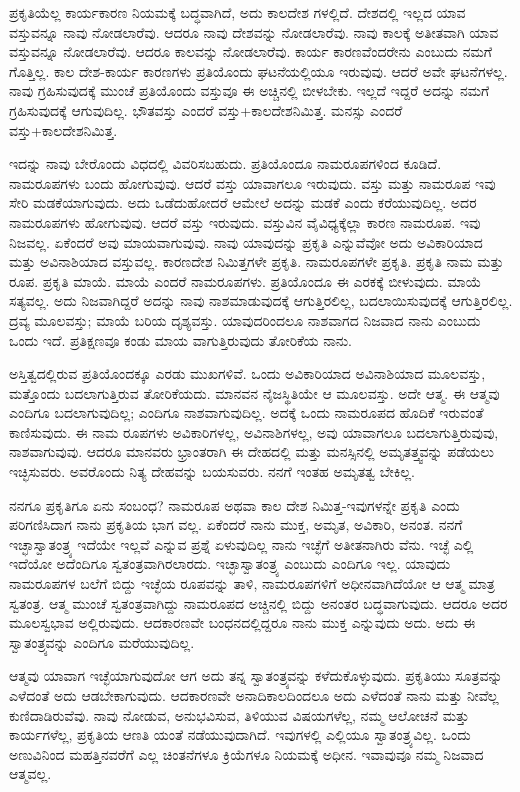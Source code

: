 ಪ್ರಕೃತಿಯೆಲ್ಲ ಕಾರ್ಯಕಾರಣ ನಿಯಮಕ್ಕೆ ಬದ್ಧವಾಗಿದೆ, ಅದು ಕಾಲದೇಶ ಗಳಲ್ಲಿದೆ. ದೇಶದಲ್ಲಿ ಇಲ್ಲದ ಯಾವ ವಸ್ತುವನ್ನೂ ನಾವು ನೋಡಲಾರೆವು. ಆದರೂ ನಾವು ದೇಶವನ್ನು ನೋಡಲಾರೆವು. ನಾವು ಕಾಲಕ್ಕೆ ಅತೀತವಾಗಿ ಯಾವ ವಸ್ತುವನ್ನೂ ನೋಡಲಾರೆವು. ಆದರೂ ಕಾಲವನ್ನು ನೋಡಲಾರೆವು. ಕಾರ್ಯ ಕಾರಣವೆಂದರೇನು ಎಂಬುದು ನಮಗೆ ಗೊತ್ತಿಲ್ಲ. ಕಾಲ ದೇಶ-ಕಾರ್ಯ ಕಾರಣಗಳು ಪ್ರತಿಯೊಂದು ಘಟನೆಯಲ್ಲಿಯೂ ಇರುವುವು. ಆದರೆ ಅವೇ ಘಟನೆಗಳಲ್ಲ. ನಾವು ಗ್ರಹಿಸುವುದಕ್ಕೆ ಮುಂಚೆ ಪ್ರತಿಯೊಂದು ವಸ್ತುವೂ ಈ ಅಚ್ಚಿನಲ್ಲಿ ಬೀಳಬೇಕು. ಇಲ್ಲದೆ ಇದ್ದರೆ ಅದನ್ನು ನಮಗೆ ಗ್ರಹಿಸುವುದಕ್ಕೆ ಆಗುವುದಿಲ್ಲ. ಭೌತವಸ್ತು ಎಂದರೆ ವಸ್ತು+ಕಾಲದೇಶನಿಮಿತ್ತ. ಮನಸ್ಸು ಎಂದರೆ ವಸ್ತು+ಕಾಲದೇಶನಿಮಿತ್ತ.

ಇದನ್ನು ನಾವು ಬೇರೊಂದು ವಿಧದಲ್ಲಿ ವಿವರಿಸಬಹುದು. ಪ್ರತಿಯೊಂದೂ ನಾಮರೂಪಗಳಿಂದ ಕೂಡಿದೆ. ನಾಮರೂಪಗಳು ಬಂದು ಹೋಗುವುವು. ಆದರೆ ವಸ್ತು ಯಾವಾಗಲೂ ಇರುವುದು. ವಸ್ತು ಮತ್ತು ನಾಮರೂಪ ಇವು ಸೇರಿ ಮಡಕೆಯಾಗುವುದು. ಅದು ಒಡೆದುಹೋದರೆ ಆಮೇಲೆ ಅದನ್ನು ಮಡಕೆ ಎಂದು ಕರೆಯುವುದಿಲ್ಲ. ಅದರ ನಾಮರೂಪಗಳು ಹೋಗುವುವು. ಆದರೆ ವಸ್ತು ಇರುವುದು. ವಸ್ತುವಿನ ವೈವಿಧ್ಯಕ್ಕೆಲ್ಲಾ ಕಾರಣ ನಾಮರೂಪ. ಇವು ನಿಜವಲ್ಲ. ಏಕೆಂದರೆ ಅವು ಮಾಯವಾಗುವುವು. ನಾವು ಯಾವುದನ್ನು ಪ್ರಕೃತಿ ಎನ್ನುವೆವೋ ಅದು ಅವಿಕಾರಿಯಾದ ಮತ್ತು ಅವಿನಾಶಿಯಾದ ವಸ್ತುವಲ್ಲ. ಕಾರಣದೇಶ ನಿಮಿತ್ತಗಳೇ ಪ್ರಕೃತಿ. ನಾಮರೂಪಗಳೇ ಪ್ರಕೃತಿ. ಪ್ರಕೃತಿ ನಾಮ ಮತ್ತು ರೂಪ. ಪ್ರಕೃತಿ ಮಾಯೆ. ಮಾಯೆ ಎಂದರೆ ನಾಮರೂಪಗಳು. ಪ್ರತಿಯೊಂದೂ ಈ ಎರಕಕ್ಕೆ ಬೀಳುವುದು. ಮಾಯೆ ಸತ್ಯವಲ್ಲ. ಅದು ನಿಜವಾಗಿದ್ದರೆ ಅದನ್ನು ನಾವು ನಾಶಮಾಡುವುದಕ್ಕೆ ಆಗುತ್ತಿರಲಿಲ್ಲ, ಬದಲಾಯಿಸುವುದಕ್ಕೆ ಆಗುತ್ತಿರಲಿಲ್ಲ. ದ್ರವ್ಯ ಮೂಲವಸ್ತು; ಮಾಯೆ ಬರಿಯ ದೃಶ್ಯವಸ್ತು. ಯಾವುದರಿಂದಲೂ ನಾಶವಾಗದ ನಿಜವಾದ ನಾನು ಎಂಬುದು ಒಂದು ಇದೆ. ಪ್ರತಿಕ್ಷಣವೂ ಕಂಡು ಮಾಯ ವಾಗುತ್ತಿರುವುದು ತೋರಿಕೆಯ ನಾನು.

ಅಸ್ತಿತ್ವದಲ್ಲಿರುವ ಪ್ರತಿಯೊಂದಕ್ಕೂ ಎರಡು ಮುಖಗಳಿವೆ. ಒಂದು ಅವಿಕಾರಿಯಾದ ಅವಿನಾಶಿಯಾದ ಮೂಲವಸ್ತು, ಮತ್ತೊಂದು ಬದಲಾಗುತ್ತಿರುವ ತೋರಿಕೆಯದು. ಮಾನವನ ನೈಜಸ್ಥಿತಿಯೇ ಆ ಮೂಲವಸ್ತು. ಅದೇ ಆತ್ಮ. ಈ ಆತ್ಮವು ಎಂದಿಗೂ ಬದಲಾಗುವುದಿಲ್ಲ; ಎಂದಿಗೂ ನಾಶವಾಗುವುದಿಲ್ಲ. ಅದಕ್ಕೆ ಒಂದು ನಾಮರೂಪದ ಹೊದಿಕೆ ಇರುವಂತೆ ಕಾಣಿಸುವುದು. ಈ ನಾಮ ರೂಪಗಳು ಅವಿಕಾರಿಗಳಲ್ಲ, ಅವಿನಾಶಿಗಳಲ್ಲ, ಅವು ಯಾವಾಗಲೂ ಬದಲಾಗುತ್ತಿರುವುವು, ನಾಶವಾಗುವುವು. ಆದರೂ ಮಾನವರು ಭ್ರಾಂತರಾಗಿ ಈ ದೇಹದಲ್ಲಿ ಮತ್ತು ಮನಸ್ಸಿನಲ್ಲಿ ಅಮೃತತ್ತ್ವವನ್ನು ಪಡೆಯಲು ಇಚ್ಛಿಸುವರು. ಅವರೊಂದು ನಿತ್ಯ ದೇಹವನ್ನು ಬಯಸುವರು. ನನಗೆ ಇಂತಹ ಅಮೃತತ್ವ ಬೇಕಿಲ್ಲ.

ನನಗೂ ಪ್ರಕೃತಿಗೂ ಏನು ಸಂಬಂಧ? ನಾಮರೂಪ ಅಥವಾ ಕಾಲ ದೇಶ ನಿಮಿತ್ತ-ಇವುಗಳನ್ನೇ ಪ್ರಕೃತಿ ಎಂದು ಪರಿಗಣಿಸಿದಾಗ ನಾನು ಪ್ರಕೃತಿಯ ಭಾಗ ವಲ್ಲ. ಏಕೆಂದರೆ ನಾನು ಮುಕ್ತ, ಅಮೃತ, ಅವಿಕಾರಿ, ಅನಂತ. ನನಗೆ ಇಚ್ಛಾಸ್ವಾತಂತ್ರ್ಯ ಇದೆಯೇ ಇಲ್ಲವೆ ಎನ್ನುವ ಪ್ರಶ್ನೆ ಏಳುವುದಿಲ್ಲ ನಾನು ಇಚ್ಛೆಗೆ ಅತೀತನಾಗಿರು ವೆನು. ಇಚ್ಛೆ ಎಲ್ಲಿ ಇದೆಯೋ ಅದೆಂದಿಗೂ ಸ್ವತಂತ್ರವಾಗಿರಲಾರದು. ಇಚ್ಛಾಸ್ವಾತಂತ್ರ್ಯ ಎಂಬುದು ಎಂದಿಗೂ ಇಲ್ಲ. ಯಾವುದು ನಾಮರೂಪಗಳ ಬಲೆಗೆ ಬಿದ್ದು ಇಚ್ಛೆಯ ರೂಪವನ್ನು ತಾಳಿ, ನಾಮರೂಪಗಳಿಗೆ ಅಧೀನವಾಗಿದೆಯೋ ಆ ಆತ್ಮ ಮಾತ್ರ ಸ್ವತಂತ್ರ. ಆತ್ಮ ಮುಂಚೆ ಸ್ವತಂತ್ರವಾಗಿದ್ದು ನಾಮರೂಪದ ಅಚ್ಚಿನಲ್ಲಿ ಬಿದ್ದು ಅನಂತರ ಬದ್ಧವಾಗುವುದು. ಆದರೂ ಅದರ ಮೂಲಸ್ವಭಾವ ಅಲ್ಲಿರುವುದು. ಆದಕಾರಣವೇ ಬಂಧನದಲ್ಲಿದ್ದರೂ ನಾನು ಮುಕ್ತ ಎನ್ನುವುದು ಅದು. ಅದು ಈ ಸ್ವಾತಂತ್ರ್ಯವನ್ನು ಎಂದಿಗೂ ಮರೆಯುವುದಿಲ್ಲ.

ಆತ್ಮವು ಯಾವಾಗ ಇಚ್ಛೆಯಾಗುವುದೋ ಆಗ ಅದು ತನ್ನ ಸ್ವಾತಂತ್ರ್ಯವನ್ನು ಕಳೆದುಕೊಳ್ಳುವುದು. ಪ್ರಕೃತಿಯು ಸೂತ್ರವನ್ನು ಎಳೆದಂತೆ ಅದು ಆಡಬೇಕಾಗುವುದು. ಆದಕಾರಣವೇ ಅನಾದಿಕಾಲದಿಂದಲೂ ಅದು ಎಳೆದಂತೆ ನಾನು ಮತ್ತು ನೀವೆಲ್ಲ ಕುಣಿದಾಡಿರುವೆವು. ನಾವು ನೋಡುವ, ಅನುಭವಿಸುವ, ತಿಳಿಯುವ ವಿಷಯಗಳೆಲ್ಲ, ನಮ್ಮ ಆಲೋಚನೆ ಮತ್ತು ಕಾರ್ಯಗಳೆಲ್ಲ, ಪ್ರಕೃತಿಯ ಆಣತಿ ಯಂತೆ ನಡೆಯುವುದಾಗಿದೆ. ಇವುಗಳಲ್ಲಿ ಎಲ್ಲಿಯೂ ಸ್ವಾತಂತ್ರ್ಯವಿಲ್ಲ. ಒಂದು ಅಣುವಿನಿಂದ ಮಹತ್ತಿನವರೆಗೆ ಎಲ್ಲ ಚಿಂತನೆಗಳೂ ಕ್ರಿಯೆಗಳೂ ನಿಯಮಕ್ಕೆ ಅಧೀನ. ಇವಾವುವೂ ನಮ್ಮ ನಿಜವಾದ ಆತ್ಮವಲ್ಲ.

